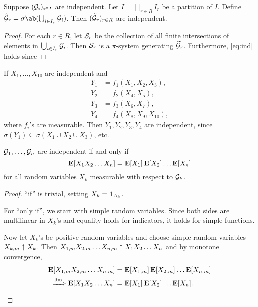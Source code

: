 \begin{lemma} \label{thm:ind:partition}
    Suppose $(\mathcal{G}_i)_{i \in I}$ are independent.
    Let $I = \bigsqcup_{r \in R} I_r$ be a partition of $I$.
    Define $\wtld \mcG_r = \sigma\ab(\bigcup_{i \in I_r} \mcG_i)$.
    Then $(\widetilde {\mathcal{G}}_r)_{r \in R}$ are independent.
\end{lemma}
\begin{proof}
    For each $r \in R$, let $\mathcal{S}_r$ be the collection of all finite
    intersections of elements in $\bigcup_{i \in I_r} \mathcal{G}_i$.
    Then $\mathcal{S}_r$ is a $\pi$-system generating $\widetilde{\mathcal{G}}_r$.
    Furthermore, \cref{eq:ind} holds since \TODO %
\end{proof}
\begin{example}
    If $X_1, \dots, X_{10}$ are independent and \begin{align*}
        Y_1 &= f_1(X_1, X_2, X_3), \\
        Y_2 &= f_2(X_4, X_5), \\
        Y_3 &= f_3(X_6, X_7), \\
        Y_4 &= f_4(X_8, X_9, X_{10}),
    \end{align*} where $f_i$'s are measurable.
    Then $Y_1, Y_2, Y_3, Y_4$ are independent, since
    $\sigma(Y_1) \subseteq \sigma(X_1 \cup X_2 \cup X_3)$, etc.
\end{example}

\begin{proposition}
    $\mathcal{G}_1, \dots, \mathcal{G}_n$ are independent if and only if \[
        \operatorname{\mathbf E}[X_1 X_2 \dots X_n] = \operatorname{\mathbf E}[X_1] \operatorname{\mathbf E}[X_2] \dots \operatorname{\mathbf E}[X_n]
    \] for all random variables $X_k$ measurable with respect to $\mathcal{G}_k$.
\end{proposition}
\begin{proof}
    ``if'' is trivial, setting $X_k = \bm{1}_{A_k}$.

    For ``only if'', we start with simple random variables.
    Since both sides are multilinear in $X_k$'s and equality holds
    for indicators, it holds for simple functions.

    Now let $X_k$'s be positive random variables and choose simple
    random variables $X_{k,m} \uparrow X_k$.
    Then $X_{1,m} X_{2,m} \dots X_{n,m} \uparrow X_1 X_2 \dots X_n$
    and by monotone convergence, \begin{align*}
        \operatorname{\mathbf E}[X_{1,m} X_{2,m} \dots X_{n,m}]
            &= \operatorname{\mathbf E}[X_{1,m}] \operatorname{\mathbf E}[X_{2,m}] \dots \operatorname{\mathbf E}[X_{n,m}] \\
        \xRightarrow{\lim} \operatorname{\mathbf E}[X_1 X_2 \dots X_n]
            &= \operatorname{\mathbf E}[X_1] \operatorname{\mathbf E}[X_2] \dots \operatorname{\mathbf E}[X_n].
    \end{align*}
\end{proof}

